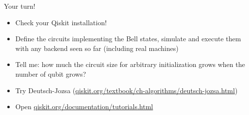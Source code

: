 \begin{frame}{Your turn!}
\begin{itemize}
    \item<1-> Check your Qiskit installation!
    \item<2-> Define the circuits implementing the Bell states, simulate and execute them with any backend seen so far (including real machines)
    \item<3-> Tell me: how much the circuit size for arbitrary initialization grows when the number of qubit grows?
    \item<4-> Try Deutsch-Jozsa (\url{qiskit.org/textbook/ch-algorithms/deutsch-jozsa.html})
    \item<5-> Open \url{qiskit.org/documentation/tutorials.html}
\end{itemize}
\end{frame}